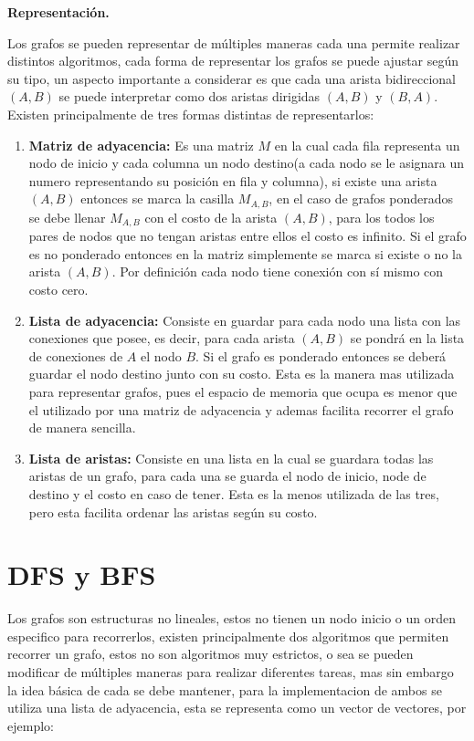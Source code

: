 \documentclass[12pt, a4paper]{article}
\newcommand{\subtitulo}[1]{\begin{center}\textbf{#1}\end{center}}
\begin{document}
	\subtitulo{Representación.}
	
	Los grafos se pueden representar de múltiples maneras cada una permite realizar distintos algoritmos, cada forma 
	de representar los grafos se puede ajustar según su tipo, un aspecto importante a considerar es que cada una arista
	bidireccional $(A,B)$ se puede interpretar como dos aristas dirigidas $(A,B)$ y $(B,A)$. Existen principalmente de
	tres formas distintas de representarlos:
	
	\begin{enumerate}[1.]
		\item \textbf{Matriz de adyacencia:} Es una matriz $M$ en la cual cada fila representa un nodo de inicio y cada
			columna un nodo destino(a cada nodo se le asignara un numero representando su posición en fila y columna), 
			si existe una arista $(A,B)$ entonces se marca la casilla $M_{A,B}$, en el caso de grafos ponderados se
			debe llenar $M_{A,B}$ con el costo de la arista $(A,B)$, para los todos los pares de nodos que no tengan
			aristas entre ellos el costo es infinito. Si el grafo es no ponderado entonces en la matriz simplemente se
			marca si existe o no la arista $(A,B)$. Por definición cada nodo tiene conexión con sí mismo con costo cero.
		\item \textbf{Lista de adyacencia:} Consiste en guardar para cada nodo una lista con las conexiones que posee,
		 	es decir, para cada arista $(A,B)$ se pondrá en la lista de conexiones de $A$ el nodo $B$. Si el grafo es
		 	ponderado entonces se deberá guardar el nodo destino junto con su costo. Esta es la manera mas utilizada 
		 	para representar grafos, pues el espacio de memoria que ocupa es menor que el utilizado por una matriz de
		 	adyacencia y ademas facilita recorrer el grafo de manera sencilla.
		\item \textbf{Lista de aristas:} Consiste en una lista en la cual se guardara todas las aristas de un grafo, 
			para cada una se guarda el nodo de inicio, node de destino y el costo en caso de tener. Esta es la menos
			 utilizada de las tres, pero esta facilita ordenar las aristas según su costo.
	\end{enumerate}
	
	\section{DFS y BFS}
	
	Los grafos son estructuras no lineales, estos no tienen un nodo inicio o un orden especifico para recorrerlos,
	existen principalmente dos algoritmos que permiten recorrer un grafo, estos no son algoritmos muy estrictos, o 
	sea se pueden modificar de múltiples maneras para realizar diferentes tareas, mas sin embargo la idea básica de
	cada se debe mantener, para la implementacion de ambos se utiliza una lista de adyacencia, esta se representa como 
	un vector de vectores, por ejemplo:
	
\end{document}
